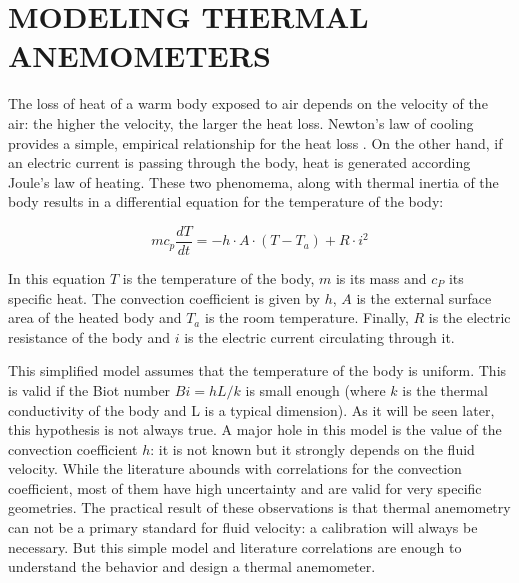 \documentclass[10pt,fleqn,a4paper,twoside]{article}
\begin{document}
\section{MODELING THERMAL ANEMOMETERS}

The loss of heat of a warm body exposed to air depends on the velocity of the air: the higher the velocity, the larger the heat loss. Newton's law of cooling provides a simple, empirical relationship for the heat loss \citep{Incropera96}. On the other hand, if an electric current is passing through the body, heat is generated according Joule's law of heating. These two phenomema, along with thermal inertia of the body results in a differential equation for the temperature of the body:

\begin{equation}
  mc_p\frac{dT}{dt} = -h\cdot A\cdot \left(T - T_a\right) + R\cdot i^2
  \label{eq:temp}
\end{equation}

In this equation $T$ is the temperature of the body, $m$ is its mass and $c_P$ its specific heat. The convection coefficient is given by $h$, $A$ is the external surface area of the heated body and $T_a$ is the room temperature. Finally, $R$ is the electric resistance of the body and $i$ is the electric current circulating through it.

This simplified model assumes that the temperature of the body is uniform. This is valid if the Biot number $Bi = hL/k$ is small enough (where $k$ is the thermal conductivity of the body and L is a typical dimension). As it will be seen later, this hypothesis is not always true. A major hole in this model is the value of the convection coefficient $h$: it is not known but it strongly depends on the fluid velocity. While the literature abounds with correlations for the convection coefficient, most of them have high uncertainty and are valid for very specific geometries. The practical result of these observations is that thermal anemometry can not be  a primary standard for fluid velocity: a calibration will always be necessary. But this simple model and literature correlations are enough to understand the behavior and design a thermal anemometer.
\end{document}

